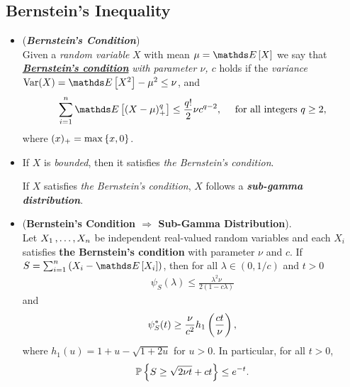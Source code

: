 \documentclass[11pt]{article}
\begin{document}
\subsection{Bernstein's Inequality}
\begin{itemize}
\item \begin{definition} (\textbf{\emph{Bernstein's Condition}}) \\
Given a \emph{random variable} $X$ with mean $\mu = \E{}{X}$ we say that \underline{\emph{\textbf{Bernstein's condition}}} \emph{with parameter $\nu$, $c$} holds if the \emph{variance} $\text{Var}(X) = \E{}{X^2} - \mu^2 \le \nu$, and
\begin{align*}
\sum_{i=1}^{n}\E{}{(X - \mu)_{+}^q} \le \frac{q!}{2} \nu c^{q-2}, \quad \text{ for all integers }q \ge 2,
\end{align*} where $(x)_{+} = \max\left\{x, 0\right\}$. 
\end{definition}

\item \begin{remark}
If $X$ is \emph{bounded}, then it satisfies \emph{the Bernstein's condition}.

If $X$ satisfies \emph{the Bernstein's condition}, $X$ follows a \emph{\textbf{sub-gamma distribution}}. 
\end{remark}


\item \begin{proposition} (\textbf{Bernstein's Condition $\Rightarrow$  Sub-Gamma Distribution}). \citep{boucheron2013concentration}\\
Let $X_1 \,{,}\ldots{,}\, X_n$ be independent real-valued random variables and each $X_i$ satisfies \textbf{the Bernstein's condition} with parameter $\nu$ and $c$.  If $S = \sum_{i=1}^{n}\paren{X_i - \E{}{X_i}}$, then for all $\lambda \in (0, 1/c)$ and $t > 0$
\begin{align*}
\psi_S(\lambda) \le \frac{\lambda^2 \nu}{2(1 - c\lambda)} 
\end{align*} and
\begin{align*}
\psi_S^{*}(t) \ge \frac{\nu}{c^2}h_1\left(\frac{ct}{\nu}\right),
\end{align*} where $h_1(u) = 1+ u - \sqrt{1 + 2u}$ for $u >0$. In particular, for all $t > 0$, 
\begin{align}
{\mathbb P}\left\{S \ge \sqrt{2\nu t} + ct \right\} \le e^{-t}. \label{ineqn: bernstein_inequality_gammar_dist_0}
\end{align}
\end{proposition}


\end{itemize}
\end{document}
